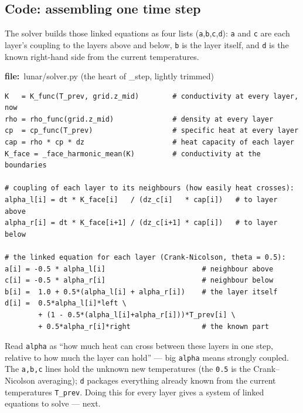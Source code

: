 \documentclass[11pt]{article}
\newcommand{\codefile}[1]{\par\smallskip\noindent
  {\footnotesize\ttfamily\color{teal!55!black}\textbf{file:}~#1}\par\nopagebreak}
\renewcommand{\codefile}[1]{\par\smallskip\noindent
    {\footnotesize\ttfamily\color{black}\textbf{file:}~#1}\par\nopagebreak}
\begin{document}
\subsection{Code: assembling one time step}
The solver builds those linked equations as four lists
(\texttt{a},\texttt{b},\texttt{c},\texttt{d}): \texttt{a} and \texttt{c}
are each layer's coupling to the layers above and below, \texttt{b} is
the layer itself, and \texttt{d} is the known right-hand side from the
current temperatures.
\codefile{lunar/solver.py (the heart of \_step, lightly trimmed)}
\begin{lstlisting}
K   = K_func(T_prev, grid.z_mid)        # conductivity at every layer, now
rho = rho_func(grid.z_mid)              # density at every layer
cp  = cp_func(T_prev)                   # specific heat at every layer
cap = rho * cp * dz                     # heat capacity of each layer
K_face = _face_harmonic_mean(K)         # conductivity at the boundaries

# coupling of each layer to its neighbours (how easily heat crosses):
alpha_l[i] = dt * K_face[i]   / (dz_c[i]   * cap[i])   # to layer above
alpha_r[i] = dt * K_face[i+1] / (dz_c[i+1] * cap[i])   # to layer below

# the linked equation for each layer (Crank-Nicolson, theta = 0.5):
a[i] = -0.5 * alpha_l[i]                       # neighbour above
c[i] = -0.5 * alpha_r[i]                       # neighbour below
b[i] =  1.0 + 0.5*(alpha_l[i] + alpha_r[i])    # the layer itself
d[i] =  0.5*alpha_l[i]*left \
        + (1 - 0.5*(alpha_l[i]+alpha_r[i]))*T_prev[i] \
        + 0.5*alpha_r[i]*right                 # the known part
\end{lstlisting}
\begin{codebox}
Read \texttt{alpha} as ``how much heat can cross between these layers in
one step, relative to how much the layer can hold'' --- big \texttt{alpha}
means strongly coupled. The \texttt{a,b,c} lines hold the unknown new
temperatures (the \texttt{0.5} is the Crank--Nicolson averaging);
\texttt{d} packages everything already known from the current
temperatures \texttt{T\_prev}. Doing this for every layer gives a system
of linked equations to solve --- next.
\end{codebox}
\end{document}
